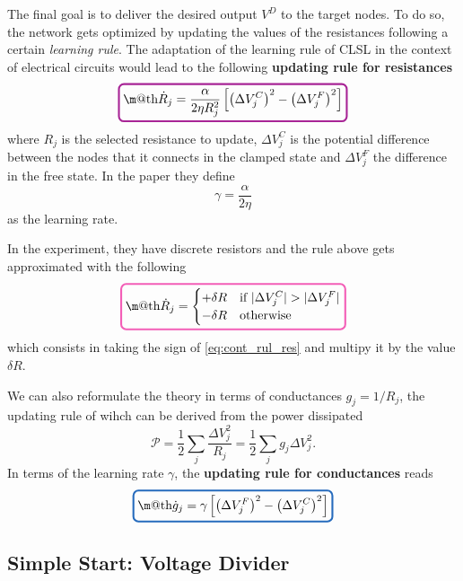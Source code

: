 \documentclass[10.5pt]{article}
\makeatletter
\newcommand*{\boxcolor}{Mulberry}
\renewcommand{\boxed}[1]{\textcolor{\boxcolor}{%
    \tikz[baseline={([yshift=-1ex]current bounding box.center)}] \node[rectangle, minimum width=1ex,rounded corners,draw, line width=1.5pt] {\normalcolor\m@th$\displaystyle#1$};}}
\newcommand*{\boxcolorc}{NavyBlue}
\newcommand{\boxedc}[1]{\textcolor{\boxcolorc}{%
    \tikz[baseline={([yshift=-1ex]current bounding box.center)}] \node[rectangle, minimum width=1ex,rounded corners,draw, line width=1.5pt] {\normalcolor\m@th$\displaystyle#1$};}}
\newcommand*{\boxcolora}{CarnationPink}
\newcommand{\boxedapp}[1]{\textcolor{\boxcolora}{%
    \tikz[baseline={([yshift=-1ex]current bounding box.center)}] \node[rectangle, minimum width=1ex,rounded corners,draw, line width=1.5pt] {\normalcolor\m@th$\displaystyle#1$};}}
\newcommand{\res}[1]{\textcolor{Mulberry}{\bf{#1}}}
\newcommand{\cond}[1]{\textcolor{NavyBlue}{\bf{#1}}}
\makeatother
\begin{document}
The final goal is to deliver the desired output $V^{D}$ to the target nodes. To do so, the network gets optimized by updating the values of the resistances following a certain \textit{learning rule}. The adaptation of the learning rule of CLSL in the context of electrical circuits would lead to the following \res{updating rule for resistances}
\begin{equation}
\boxed{\dot{R}_j = \frac{\alpha}{2\eta R_{j}^2} \left[ \left( \Delta V_{j}^{C}\right)^2 - \left( \Delta V_{j}^{F}\right)^2 \right] }
\label{eq:cont_rul_res}   
\end{equation}
where $R_{j}$ is the selected resistance to update, $\Delta V_{j}^{C}$ is the potential difference between the nodes that it connects in the clamped state and $\Delta V_{j}^{F}$ the difference in the free state. In the paper \cite{Dillavou} they define
\[
\gamma = \frac{\alpha}{2\eta}
\]
as the learning rate.

In the experiment, they have discrete resistors and the rule above gets approximated with the following 
\begin{equation}
\boxedapp{\dot{R}_j = \begin{cases} 
    +\delta R & \text{if} \ |\Delta V^{C}_{j}|>|\Delta V^{F}_{j}| \\
    -\delta R & \text{otherwise}
 \end{cases}}
\label{eq:disc_rul_res}
\end{equation}
which consists in taking the sign of \cref{eq:cont_rul_res} and multipy it by the value $\delta R$.

We can also reformulate the theory in terms of conductances $g_j = 1/R_j$, the updating rule of wihch can be derived from the power dissipated
\[
\mathcal{P}  = \frac{1}{2} \sum_{j} \frac{\Delta V_j^2}{R_j} = \frac{1}{2} \sum_{j} g_j \Delta V_j^2.
\]
In terms of the learning rate $\gamma$, the \cond{updating rule for conductances} reads
\begin{equation}
    \boxedc{\dot{g}_j = \gamma \left[ \left( \Delta V_{j}^{F}\right)^2 - \left( \Delta V_{j}^{C}\right)^2 \right] }   
\label{eq:cond_update_cont}
\end{equation}

\subsection{Simple Start: Voltage Divider}
\end{document}
